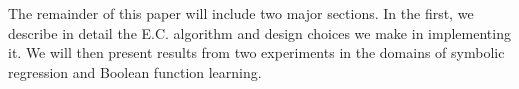 \documentclass{article}
\DeclareMathOperator*{\argmax}{arg\,max}
\begin{document}



The remainder of this paper will include two major sections. In the
first, we describe in detail the E.C. algorithm and design choices we
make in implementing it. We will then present results from two
experiments in the domains of symbolic regression and Boolean
function learning.



\end{document}
